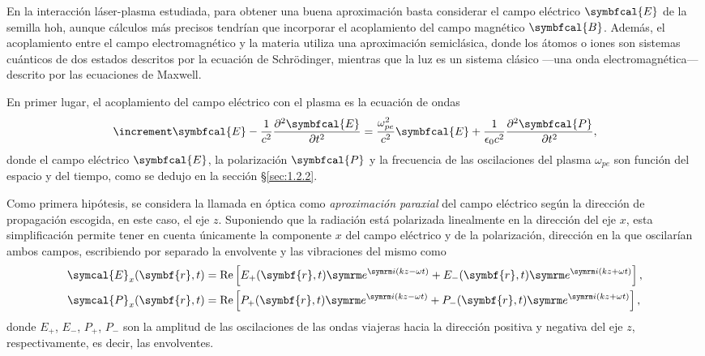 En la interacción láser-plasma estudiada, para obtener una buena aproximación basta considerar el campo eléctrico $\symbfcal{E}$ de la semilla \acrshort{hoh}, aunque cálculos más precisos tendrían que incorporar el acoplamiento del campo magnético $\symbfcal{B}$. Además, el acoplamiento entre el campo electromagnético y la materia utiliza una aproximación semiclásica, donde los átomos o iones son sistemas cuánticos de dos estados descritos por la ecuación de Schrödinger, mientras que la luz es un sistema clásico ---una onda electromagnética--- descrito por las ecuaciones de Maxwell.

En primer lugar, el acoplamiento del campo eléctrico con el plasma es la ecuación de ondas 
\begin{equation}\label{eq:3.1}
  \laplacian \symbfcal{E} - \frac{1}{c^{2}}\pdvN{\symbfcal{E}}{t}{2} = \frac{\omega^{2}_{pe}}{c^{2}}\symbfcal{E} + \frac{1}{\epsilon_{0}c^{2}}\pdvN{\symbfcal{P}}{t}{2},
\end{equation}
\noindent
donde el campo eléctrico $\symbfcal{E}$, la polarización $\symbfcal{P}$ y la frecuencia de las oscilaciones del plasma $\omega_{pe}$ son función del espacio y del tiempo, como se dedujo en la sección \S\ref{sec:1.2.2}. 

Como primera hipótesis, se considera la llamada en óptica\autocite{hechtOpticsGlobalEdition2016} como \emph{aproximación paraxial} del campo eléctrico según la dirección de propagación escogida, en este caso, el eje $z$. Suponiendo que la radiación está polarizada linealmente en la dirección del eje $x$, esta simplificación permite tener en cuenta únicamente la componente $x$ del campo eléctrico y de la polarización, dirección en la que oscilarían ambos campos, escribiendo por separado la envolvente y las vibraciones del mismo como
\begin{align}\label{eq:3.2}
  \symcal{E}_{x}(\symbf{r},t) &= \RE \left[E_{+}(\symbf{r},t)\eu^{\iu (kz - \omega t)} + E_{-}(\symbf{r},t)\eu^{\iu (kz + \omega t)}\right], \\
  \symcal{P}_{x}(\symbf{r},t) &= \RE \left[P_{+}(\symbf{r},t)\eu^{\iu (kz - \omega t)} + P_{-}(\symbf{r},t)\eu^{\iu (kz + \omega t)}\right], 
\end{align}
\noindent
donde $E_{+}$, $E_{-}$, $P_{+}$, $P_{-}$ son la amplitud de las oscilaciones de las ondas viajeras hacia la dirección positiva y negativa del eje $z$, respectivamente, es decir, las envolventes. 

